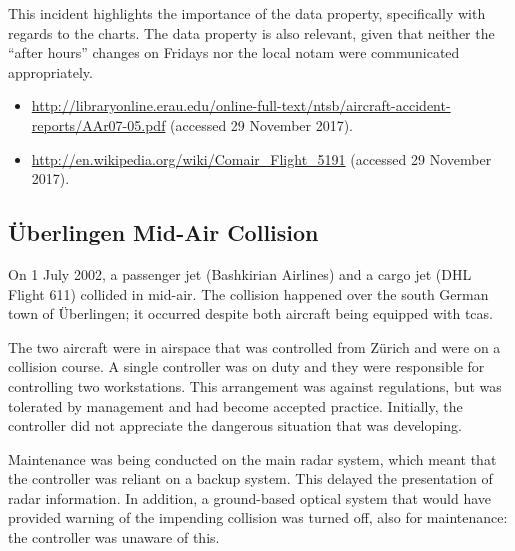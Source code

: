 This incident highlights the importance of the  \gls{data property}, specifically with regards to the charts. The  \gls{data property} is also relevant, given that neither the ``after hours'' changes on Fridays nor the local \gls{notam} were communicated appropriately.

\begin{samepage}
\begin{itemize}
  \item \raggedright{\href{http://libraryonline.erau.edu/online-full-text/ntsb/aircraft-accident-reports/AAr07-05.pdf}{http://libraryonline.erau.edu/online-full-text/ntsb/aircraft-accident-reports/AAr07-05.pdf} (accessed 29 November 2017).}
	\item \raggedright{\href{http://en.wikipedia.org/wiki/Comair_Flight_5191}{http://en.wikipedia.org/wiki/Comair\_Flight\_5191} (accessed 29 November 2017).}
\end{itemize}
\end{samepage}


\subsection{\"Uberlingen Mid-Air Collision} \label{bkm:incacc:uberlingen}
On 1 July 2002, a passenger jet (Bashkirian Airlines) and a cargo jet (DHL Flight 611) collided in mid-air. The collision happened over the south German town of \"Uberlingen; it occurred despite both aircraft being equipped with \gls{tcas}.

The two aircraft were in airspace that was controlled from Z\"urich and were on a collision course. A single controller was on duty and they were responsible for controlling two workstations. This arrangement was against regulations, but was tolerated by management and had become accepted practice. Initially, the controller did not appreciate the dangerous situation that was developing.

Maintenance was being conducted on the main radar system, which meant that the controller was reliant on a backup system. This delayed the presentation of radar \gls{information}. In addition, a ground-based optical system that would have provided warning of the impending collision was turned off, also for maintenance: the controller was unaware of this.

